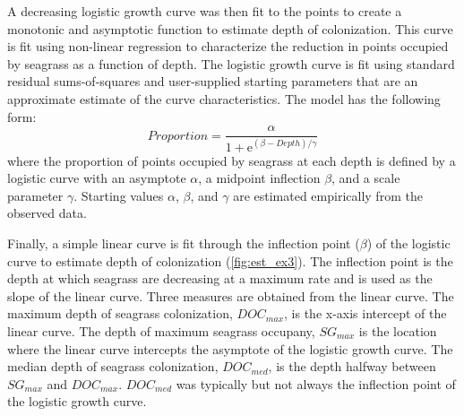 \documentclass[letterpaper,12pt,oneside]{article}\usepackage[]{graphicx}\usepackage[]{color}
\begin{document}
A decreasing logistic growth curve was then fit to the points to create a monotonic and asymptotic function to estimate depth of colonization.  This curve is fit using non-linear regression to characterize the reduction in points occupied by seagrass as a function of depth.  The logistic growth curve is fit using standard residual sums-of-squares and user-supplied starting parameters that are an approximate estimate of the curve characteristics.  The model has the following form:
\begin{equation}
 Proportion = \frac{\alpha}{1 + \mathrm{e}^{{\left(\beta - Depth\right)/\gamma}}}
\end{equation}
where the proportion of points occupied by seagrass at each depth is defined by a logistic curve with an asymptote $\alpha$, a midpoint inflection $\beta$, and a scale parameter $\gamma$.  Starting values $\alpha$, $\beta$, and $\gamma$ are estimated empirically from the observed data.  

Finally, a simple linear curve is fit through the inflection point ($\beta$) of the logistic curve to estimate depth of colonization (\cref{fig:est_ex3}).  The inflection point is the depth at which seagrass are decreasing at a maximum rate and is used as the slope of the linear curve.  Three measures are obtained from the linear curve. The maximum depth of seagrass colonization, $DOC_{max}$, is the x-axis intercept of the linear curve.  The depth of maximum seagrass occupany, $SG_{max}$ is the location where the linear curve intercepts the asymptote of the logistic growth curve.  The median depth of seagrass colonization, $DOC_{med}$, is the depth halfway between $SG_{max}$ and $DOC_{max}$.  $DOC_{med}$ was typically but not always the inflection point of the logistic growth curve.    
\end{document}
